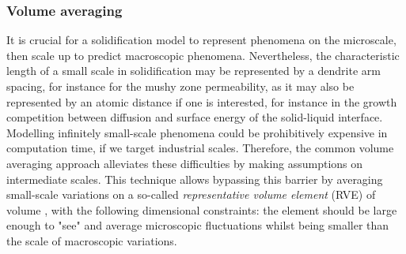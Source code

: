 \subsubsection{Volume averaging} \label{sec:volumeavg}
It is crucial for a solidification model to represent phenomena on the microscale, then scale up to predict 
macroscopic phenomena. Nevertheless, the characteristic length of a small scale in solidification may be represented by a dendrite arm spacing, 
for instance for the mushy zone permeability, as it may also be represented by an atomic distance if one is interested, 
for instance in the growth competition between diffusion and surface energy of the solid-liquid interface.
Modelling infinitely small-scale phenomena could be prohibitively expensive in computation time, if we target industrial scales.
Therefore, the common volume averaging approach alleviates these difficulties by making assumptions on intermediate scales. 
This technique allows bypassing this barrier by averaging small-scale variations on a so-called 
\emph{representative volume element} (RVE) \citep{dantzig_solidification_2009} of volume \rev, with the following 
dimensional constraints: the element should be large enough to "see" and average microscopic fluctuations 
whilst being smaller than the scale of macroscopic variations.

